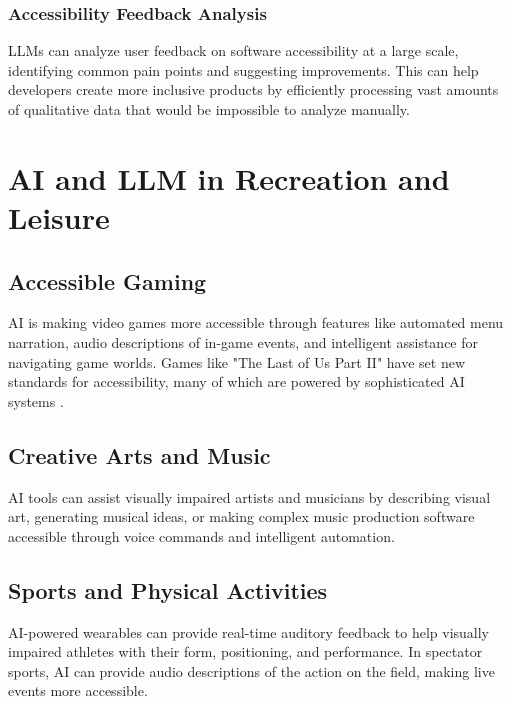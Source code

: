 \subsubsection{Accessibility Feedback Analysis}\label{ch9:sssec:feedback-analysis}
LLMs can analyze user feedback on software accessibility at a large scale, identifying common pain points and suggesting improvements. This can help developers create more inclusive products by efficiently processing vast amounts of qualitative data that would be impossible to analyze manually.

\section{AI and LLM in Recreation and Leisure}\label{ch9:sec:recreation}

\subsection{Accessible Gaming}\label{ch9:ssec:accessible-gaming}
AI is making video games more accessible through features like automated menu narration, audio descriptions of in-game events, and intelligent assistance for navigating game worlds. Games like "The Last of Us Part II" have set new standards for accessibility, many of which are powered by sophisticated AI systems \supercite{TLOU2Accessibility}.

\subsection{Creative Arts and Music}\label{ch9:ssec:creative-arts}
AI tools can assist visually impaired artists and musicians by describing visual art, generating musical ideas, or making complex music production software accessible through voice commands and intelligent automation.

\subsection{Sports and Physical Activities}\label{ch9:ssec:sports}
AI-powered wearables can provide real-time auditory feedback to help visually impaired athletes with their form, positioning, and performance. In spectator sports, AI can provide audio descriptions of the action on the field, making live events more accessible.

